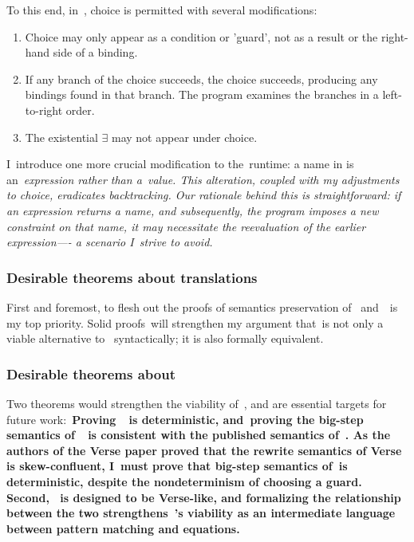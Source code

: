 \documentclass[manuscript,screen 12pt, nonacm]{acmart}
\begin{document}
    To this end, in~\VMinus, choice is permitted with several modifications:
    
        \begin{enumerate}
        \item Choice may only appear as a condition or 'guard', not as a result
        or the right-hand side of a binding.
        \item If any branch of the choice succeeds, the choice succeeds,
        producing any bindings found in that branch. The program examines the
        branches in a left-to-right order.
        \item The existential $\exists$ may not appear under choice.
        \end{enumerate}
        
        I~introduce one more crucial modification to the~\VC runtime: a name in
        \VMinus is an~\it{expression} rather than a~\it{value}. This alteration,
        coupled with my adjustments to choice, eradicates backtracking. Our
        rationale behind this is straightforward: if an expression returns a
        name, and subsequently, the program imposes a new constraint on that
        name, it may necessitate the reevaluation of the earlier expression—- a
        scenario I~strive to avoid. 

        \subsubsection{Desirable theorems about translations}
        First and foremost, to flesh out the proofs of semantics preservation of
        \PTran\ and~\DTran\ is my top priority. Solid proofs~will strengthen my
        argument that~\VMinus is not only a viable alternative to~\PPlus
        syntactically; it is also formally equivalent. 

        \subsubsection{Desirable theorems about~\VMinus}
        Two theorems would strengthen the viability of~\VMinus, and are
        essential targets for future work:~\bf{Proving~\VMinus~is
        deterministic}, and~\bf{proving the big-step semantics of~\VMinus~is
        consistent with the published semantics of~\VC.} As the authors of the
        Verse paper proved that the rewrite semantics of Verse is
        skew-confluent, I~must prove that big-step semantics of~\VMinus is
        deterministic, despite the nondeterminism of choosing a guard. Second,
        \VMinus~is designed to be Verse-like, and formalizing the relationship
        between the two strengthens~\VMinus's viability as an intermediate
        language between pattern matching and equations. 
\end{document}
